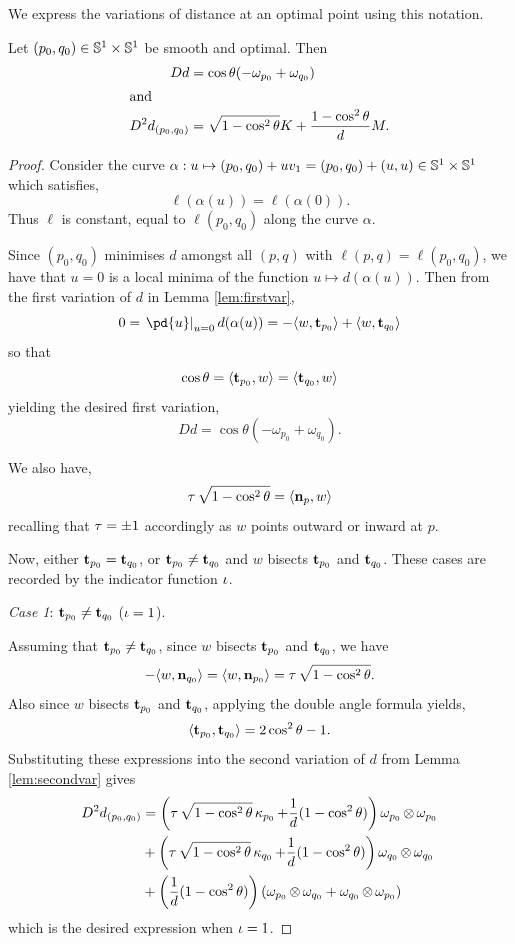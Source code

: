 \documentclass[12pt]{amsart}
\begin{document}
We express the variations of distance at an optimal point using this notation.

\begin{prop}
\label{prop:spatial_var}
Let $(p_0, q_0) \in \mathbb{S}^1 \times \mathbb{S}^1$ be smooth and optimal. Then
\[
\begin{split}
D d &= \cos\theta(-\omega_{p_0} + \omega_{q_0}) \\
\intertext{and}
D^2d_{(p_0,q_0)} &= \sqrt{1-\cos^2\theta}K + \frac{1-\cos^2 \theta}{d} M.
\end{split}
\]
\end{prop}

\begin{proof}
Consider the curve $\alpha: u \mapsto (p_0,q_0) + uv_1 = (p_0,q_0) + (u, u) \in \mathbb{S}^1\times \mathbb{S}^1$ which satisfies,
\[
\ell(\alpha(u)) = \ell(\alpha(0)).
\]
Thus $\ell$ is constant, equal to $\ell(p_0, q_0)$ along the curve $\alpha$.

Since $(p_0, q_0)$ minimises $d$ amongst all $(p,q)$ with $\ell(p, q) = \ell(p_0, q_0)$, we have that $u=0$ is a local minima of the function $u\mapsto d(\alpha(u))$. Then from the first variation of $d$ in Lemma \ref{lem:firstvar},
\[
0 = \left.\pd{u}\right|_{u=0} d(\alpha(u)) = -\ip{w}{\tang_{p_0}} + \ip{w}{\tang_{q_0}}
\]
so that
\[
\cos\theta = \langle{\operatorname{\mathbf{t}}_{p_0}},{w}\rangle = \langle{\operatorname{\mathbf{t}}_{q_0}},{w}\rangle
\]
yielding the desired first variation,
\[
Dd = \cos\theta(-\omega_{p_0} + \omega_{q_0}).
\]

We also have,
\[
\operatorname{\tau} \sqrt{1 - \cos^2 \theta} = \langle{\operatorname{\mathbf{n}}_p},{w}\rangle
\]
recalling that \(\operatorname{\tau} = \pm 1\) accordingly as \(w\) points outward or inward at \(p\).

Now, either $\operatorname{\mathbf{t}}_{p_0} = \operatorname{\mathbf{t}}_{q_0}$, or $\operatorname{\mathbf{t}}_{p_0} \ne \operatorname{\mathbf{t}}_{q_0}$ and $w$ bisects $\operatorname{\mathbf{t}}_{p_0}$ and $\operatorname{\mathbf{t}}_{q_0}$. These cases are recorded by the indicator function $\operatorname{\iota}$.

\emph{Case 1}: $\operatorname{\mathbf{t}}_{p_0} \ne \operatorname{\mathbf{t}}_{q_0}$ ($\operatorname{\iota} = 1$).

Assuming that $\operatorname{\mathbf{t}}_{p_0} \ne \operatorname{\mathbf{t}}_{q_0}$, since \(w\) bisects \(\operatorname{\mathbf{t}}_{p_0}\) and \(\operatorname{\mathbf{t}}_{q_0}\), we have
\[
-\langle{w},{\operatorname{\mathbf{n}}_{q_0}}\rangle = \langle{w},{\operatorname{\mathbf{n}}_{p_0}}\rangle = \operatorname{\tau} \sqrt{1-\cos^2\theta}.
\]
Also since $w$ bisects $\operatorname{\mathbf{t}}_{p_0}$ and $\operatorname{\mathbf{t}}_{q_0}$, applying the double angle formula yields,
\[
\langle{\operatorname{\mathbf{t}}_{p_0}},{\operatorname{\mathbf{t}}_{q_0}}\rangle = 2\cos^2\theta - 1.
\]
Substituting these expressions into the second variation of $d$ from Lemma \ref{lem:secondvar} gives
\begin{align*}
D^2d_{(p_0,q_0)} &=  \left(\operatorname{\tau} \sqrt{1-\cos^2\theta}\operatorname{\kappa}_{p_0} + \frac{1}{d}(1 - \cos^2\theta) \right) \omega_{p_0} \operatorname{\otimes} \omega_{p_0} \\
&+ \left(\operatorname{\tau} \sqrt{1-\cos^2\theta} \operatorname{\kappa}_{q_0} + \frac{1}{d}(1 - \cos^2\theta) \right) \omega_{q_0} \operatorname{\otimes} \omega_{q_0} \\
&+ \left(\frac{1}{d}(1 - \cos^2\theta) \right) \left(\omega_{p_0} \operatorname{\otimes} \omega_{q_0} + \omega_{q_0} \operatorname{\otimes} \omega_{p_0} \right)
\end{align*}
which is the desired expression when $\operatorname{\iota}=1$.


\end{proof}
\end{document}
